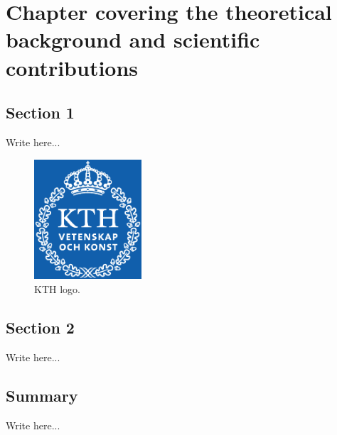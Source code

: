 \chapter{Chapter covering the theoretical background and scientific contributions} 

\section{Section 1}

Write here...

\begin{figure}[]
  \begin{center}
    \includegraphics[width=4cm]{./figures/fig1.eps}
    \caption{KTH logo.}
    \label{fig:fig1}
  \end{center}
\end{figure}

\section{Section 2}

Write here...

\section{Summary}

Write here...
